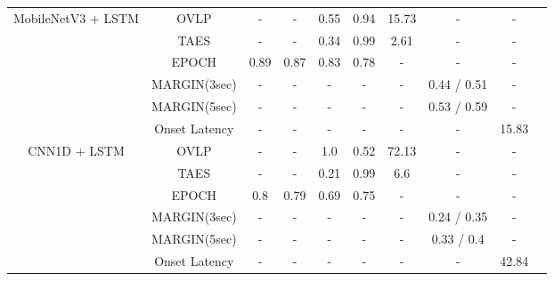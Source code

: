 \documentclass[pmlr,twocolumn,10pt]{jmlr}
\begin{document}
\begin{table*}[ht!]
\begin{tabular}{c|c|cccccccc}
		\midrule
		\multirow{6}{*}{MobileNetV3 + LSTM} 
		& OVLP & - & - & 0.55 & 0.94 & 15.73 & - & - \\
		& TAES & - & - & 0.34 & 0.99 & 2.61 & - & - \\
		& EPOCH & 0.89 & 0.87 & 0.83 & 0.78 & - & - & -  \\
		& MARGIN(3sec)  & - & - & - & - & - & 0.44 / 0.51 & -  \\
		& MARGIN(5sec) & - & - & - & - & - & 0.53 / 0.59 &  - \\
		& Onset Latency & - & - & - & - & - & - & 15.83 \\

		\midrule
		\multirow{6}{*}{CNN1D + LSTM} 
		& OVLP & - & - & 1.0 & 0.52 & 72.13 & - & - \\
		& TAES & - & - & 0.21 & 0.99 & 6.6 & - & - \\
		& EPOCH & 0.8 & 0.79 & 0.69 & 0.75 & - & - & -  \\
		& MARGIN(3sec)  & - & - & - & - & - & 0.24 / 0.35 & -  \\
		& MARGIN(5sec) & - & - & - & - & - & 0.33 / 0.4 & -  \\
		& Onset Latency & - & - & - & - & - & - & 42.84 \\
		

\end{tabular}
\end{table*}
\end{document}
